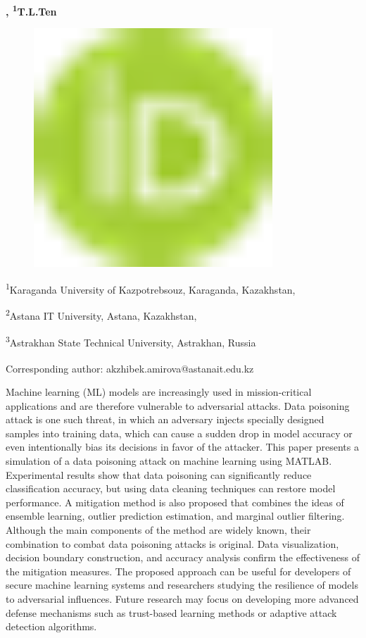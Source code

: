 {\bfseries ,
\textsuperscript{1}T.L.Ten}
\begin{figure}[H]
	\centering
	\includegraphics[width=0.8\textwidth]{media/ict2/image1}
	\caption*{}
\end{figure}


\textsuperscript{1}Karaganda University of Kazpotrebsouz, Karaganda,
Kazakhstan,

\textsuperscript{2}Astana IT University, Astana, Kazakhstan,

\textsuperscript{3}Astrakhan State Technical University, Astrakhan,
Russia

{\bfseries \textsuperscript{\envelope }}Corresponding author:
akzhibek.amirova@astanait.edu.kz

Machine learning (ML) models are increasingly used in mission-critical
applications and are therefore vulnerable to adversarial attacks. Data
poisoning attack is one such threat, in which an adversary injects
specially designed samples into training data, which can cause a sudden
drop in model accuracy or even intentionally bias its decisions in favor
of the attacker. This paper presents a simulation of a data poisoning
attack on machine learning using MATLAB. Experimental results show that
data poisoning can significantly reduce classification accuracy, but
using data cleaning techniques can restore model performance. A
mitigation method is also proposed that combines the ideas of ensemble
learning, outlier prediction estimation, and marginal outlier filtering.
Although the main components of the method are widely known, their
combination to combat data poisoning attacks is original. Data
visualization, decision boundary construction, and accuracy analysis
confirm the effectiveness of the mitigation measures. The proposed
approach can be useful for developers of secure machine learning systems
and researchers studying the resilience of models to adversarial
influences. Future research may focus on developing more advanced
defense mechanisms such as trust-based learning methods or adaptive
attack detection algorithms.

